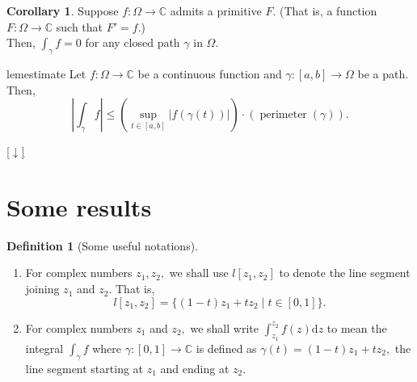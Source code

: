 \documentclass[12pt,oneside]{book}
\theoremstyle{definition}
\numberwithin{thm}{chapter}
\newtheorem{defn}[thm]{Definition}
\newtheorem{cor}[thm]{Corollary}
\newcommand{\downsym}{[$\downarrow$]}
\begin{document}
\begin{cor}\label{cor:intzeroprim}
	Suppose $f:\Omega \to \mathbb{C}$ admits a primitive $F.$ (That is, a function $F:\Omega \to \mathbb{C}$ such that $F' = f.$)\\
	Then, $\displaystyle\int_\gamma f = 0$ for any closed path $\gamma$ in $\Omega.$
\end{cor}

\begin{restatable}[M-L inequality]{lem}{estimate}
\label{lem:estimate}
	Let $f:\Omega \to \mathbb{C}$ be a continuous function and $\gamma:[a, b] \to \Omega$ be a path. Then,
	\begin{equation*} 
		\left|\int_\gamma f\right| \le \left(\sup_{t \in [a, b]}|f(\gamma(t))|\right)\cdot\left(\operatorname{perimeter}(\gamma)\right).
	\end{equation*}
\end{restatable}
\begin{flushright}\hyperref[lem:estimate2]{\downsym}\end{flushright}

\section{Some results}

\begin{defn}[Some useful notations]
	\phantom{line}
	\begin{enumerate}
		\item For complex numbers $z_1, z_2,$ we shall use $l[z_1, z_2]$ to denote the line segment joining $z_1$ and $z_2.$ That is,
		\begin{equation*} 
			l[z_1, z_2] = \{(1 - t)z_1 + tz_2 \mid t \in [0, 1]\}.	
		\end{equation*}
		\item For complex numbers $z_1$ and $z_2,$ we shall write $\displaystyle\int_{z_1}^{z_2} f(z) \mathrm{d}z$ to mean the integral $\displaystyle\int_{\gamma}^{} f$ where $\gamma:[0, 1]\to \mathbb{C}$ is defined as $\gamma(t) = (1 - t)z_1 + tz_2,$ the line segment starting at $z_1$ and ending at $z_2.$
	\end{enumerate}
\end{defn}
\end{document}
